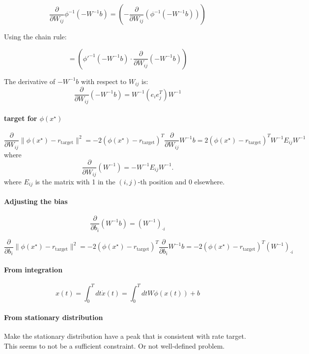 \documentclass{article}
\theoremstyle{definition} \newtheorem{definition}{Definition}
\theoremstyle{remark} \newtheorem{remark}{Remark}
\newcounter{ct}
\begin{document}
\[
 \frac{\partial}{\partial W_{ij}} \phi^{-1}(-W^{-1} b) =   \left( - \frac{\partial}{\partial W_{ij}} \left( \phi^{-1}(-W^{-1} b) \right) \right)
\]

Using the chain rule:

\[
=  \left( \phi'^{-1}(-W^{-1} b) \cdot \frac{\partial}{\partial W_{ij}} \left( -W^{-1} b \right) \right)
\]


The derivative of \( -W^{-1} b \) with respect to \( W_{ij} \) is:
\[
\frac{\partial}{\partial W_{ij}} \left( -W^{-1} b \right) = W^{-1} \left( e_i e_j^T \right) W^{-1}
\]

\paragraph{target for $\phi(x^\star)$}
\[\frac{\partial}{\partial W_{ij}} \|\phi(x^\star) - r_{\operatorname{target}}\|^2 = -2(\phi(x^\star) - r_{\operatorname{target}})^T\frac{\partial}{\partial W_{ij}}W^{-1}b = 2(\phi(x^\star) - r_{\operatorname{target}})^TW^{-1} E_{ij} W^{-1} \]
where
\[
\frac{\partial}{\partial W_{ij}} \left( W^{-1} \right) = - W^{-1} E_{ij} W^{-1}.
\]
where \( E_{ij} \) is the matrix with 1 in the \( (i, j) \)-th position and 0 elsewhere.


\paragraph{Adjusting the bias}
\[
\frac{\partial}{\partial b_i} \left( W^{-1} b \right) = \left( W^{-1} \right)_{\cdot i}
\]

\[\frac{\partial}{\partial b_{i}} \|\phi(x^\star) - r_{\operatorname{target}}\|^2 = -2(\phi(x^\star) - r_{\operatorname{target}})^T\frac{\partial}{\partial b_{i}}W^{-1}b = -2(\phi(x^\star) - r_{\operatorname{target}})^T \left( W^{-1} \right)_{\cdot i}\]


\paragraph{From integration}
\[
x(t) = \int_0^Tdt \dot x(t) = \int_0^Tdt W\phi(x(t)) + b
\]

\paragraph{From stationary distribution}
Make the stationary distribution have a peak that is consistent with rate target.
This seems to not be a sufficient constraint. 
Or not well-defined problem.
\end{document}
